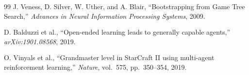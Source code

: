\documentclass[conference]{IEEEtran}
\begin{document}
\begin{thebibliography}{99}
J. Veness, D. Silver, W. Uther, and A. Blair, ``Bootstrapping from Game Tree
Search,'' \textit{Advances in Neural Information Processing Systems}, 2009.

D. Balduzzi et al., ``Open-ended learning leads to generally capable agents,''
\textit{arXiv:1901.08568}, 2019.

O. Vinyals et al., ``Grandmaster level in StarCraft II using multi-agent
reinforcement learning,'' \textit{Nature}, vol.\ 575, pp.\ 350--354, 2019.

\end{thebibliography}
\end{document}
